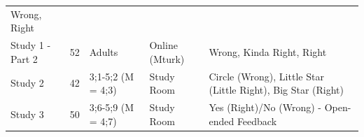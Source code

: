 \documentclass[floatsintext,man]{apa6}
\theoremstyle{definition}
\theoremstyle{definition}
\theoremstyle{definition}
\theoremstyle{remark}
\begin{document}
\begin{longtable}[]{@{}lllll@{}}
\begin{minipage}[t]{0.32\columnwidth}
Wrong, Right\strut
\end{minipage}\tabularnewline
\begin{minipage}[t]{0.19\columnwidth}\raggedright\strut
Study 1 - Part 2\strut
\end{minipage} & \begin{minipage}[t]{0.02\columnwidth}\raggedright\strut
52\strut
\end{minipage} & \begin{minipage}[t]{0.20\columnwidth}\raggedright\strut
Adults\strut
\end{minipage} & \begin{minipage}[t]{0.11\columnwidth}\raggedright\strut
Online (Mturk)\strut
\end{minipage} & \begin{minipage}[t]{0.32\columnwidth}\raggedright\strut
Wrong, Kinda Right, Right\strut
\end{minipage}\tabularnewline
\begin{minipage}[t]{0.19\columnwidth}\raggedright\strut
Study 2\strut
\end{minipage} & \begin{minipage}[t]{0.02\columnwidth}\raggedright\strut
42\strut
\end{minipage} & \begin{minipage}[t]{0.20\columnwidth}\raggedright\strut
3;1-5;2 (M = 4;3)\strut
\end{minipage} & \begin{minipage}[t]{0.11\columnwidth}\raggedright\strut
Study Room\strut
\end{minipage} & \begin{minipage}[t]{0.32\columnwidth}\raggedright\strut
Circle (Wrong), Little Star (Little Right), Big Star (Right)\strut
\end{minipage}\tabularnewline
\begin{minipage}[t]{0.19\columnwidth}\raggedright\strut
Study 3\strut
\end{minipage} & \begin{minipage}[t]{0.02\columnwidth}\raggedright\strut
50\strut
\end{minipage} & \begin{minipage}[t]{0.20\columnwidth}\raggedright\strut
3;6-5;9 (M = 4;7)\strut
\end{minipage} & \begin{minipage}[t]{0.11\columnwidth}\raggedright\strut
Study Room\strut
\end{minipage} & \begin{minipage}[t]{0.32\columnwidth}\raggedright\strut
Yes (Right)/No (Wrong) - Open-ended Feedback\strut
\end{minipage}\tabularnewline
\bottomrule
\end{longtable}
\end{document}
